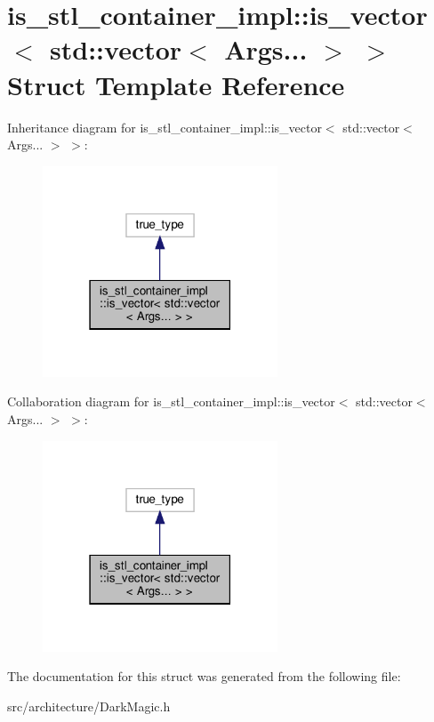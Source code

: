 \hypertarget{structis__stl__container__impl_1_1is__vector_3_01std_1_1vector_3_01Args_8_8_8_01_4_01_4}{}\section{is\+\_\+stl\+\_\+container\+\_\+impl\+:\+:is\+\_\+vector$<$ std\+:\+:vector$<$ Args... $>$ $>$ Struct Template Reference}
\label{structis__stl__container__impl_1_1is__vector_3_01std_1_1vector_3_01Args_8_8_8_01_4_01_4}


Inheritance diagram for is\+\_\+stl\+\_\+container\+\_\+impl\+:\+:is\+\_\+vector$<$ std\+:\+:vector$<$ Args... $>$ $>$\+:
\nopagebreak
\begin{figure}[H]
\begin{center}
\leavevmode
\includegraphics[width=198pt]{structis__stl__container__impl_1_1is__vector_3_01std_1_1vector_3_01Args_8_8_8_01_4_01_4__inherit__graph}
\end{center}
\end{figure}


Collaboration diagram for is\+\_\+stl\+\_\+container\+\_\+impl\+:\+:is\+\_\+vector$<$ std\+:\+:vector$<$ Args... $>$ $>$\+:
\nopagebreak
\begin{figure}[H]
\begin{center}
\leavevmode
\includegraphics[width=198pt]{structis__stl__container__impl_1_1is__vector_3_01std_1_1vector_3_01Args_8_8_8_01_4_01_4__coll__graph}
\end{center}
\end{figure}


The documentation for this struct was generated from the following file\+:\begin{DoxyCompactItemize}
\item 
src/architecture/Dark\+Magic.\+h\end{DoxyCompactItemize}
